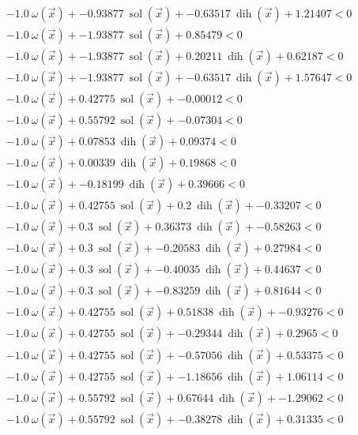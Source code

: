 \documentclass{article} %
\DeclareMathOperator{\sol}{sol}
\DeclareMathOperator{\dih}{dih}
\newcommand{\vx}{\vec{x}}
\begin{document}
\begin{align*}
&-1.0\ \omega(\vx) + -0.93877\ \sol(\vx) + -0.63517\ \dih(\vx) + 1.21407 < 0 \tag{D\_563250599} \\
&-1.0\ \omega(\vx) + -1.93877\ \sol(\vx) + 0.85479 < 0 \tag{D\_439521695} \\
&-1.0\ \omega(\vx) + -1.93877\ \sol(\vx) + 0.20211\ \dih(\vx) + 0.62187 < 0 \tag{D\_805633512} \\
&-1.0\ \omega(\vx) + -1.93877\ \sol(\vx) + -0.63517\ \dih(\vx) + 1.57647 < 0 \tag{D\_892141600} \\
&-1.0\ \omega(\vx) + 0.42775\ \sol(\vx) + -0.00012 < 0 \tag{D\_224306197} \\
&-1.0\ \omega(\vx) + 0.55792\ \sol(\vx) + -0.07304 < 0 \tag{D\_120210454} \\
&-1.0\ \omega(\vx) + 0.07853\ \dih(\vx) + 0.09374 < 0 \tag{D\_479875130} \\
&-1.0\ \omega(\vx) + 0.00339\ \dih(\vx) + 0.19868 < 0 \tag{D\_629548058} \\
&-1.0\ \omega(\vx) + -0.18199\ \dih(\vx) + 0.39666 < 0 \tag{D\_469668150} \\
&-1.0\ \omega(\vx) + 0.42755\ \sol(\vx) + 0.2\ \dih(\vx) + -0.33207 < 0 \tag{D\_218128189} \\
&-1.0\ \omega(\vx) + 0.3\ \sol(\vx) + 0.36373\ \dih(\vx) + -0.58263 < 0 \tag{D\_169113912} \\
&-1.0\ \omega(\vx) + 0.3\ \sol(\vx) + -0.20583\ \dih(\vx) + 0.27984 < 0 \tag{D\_143105921} \\
&-1.0\ \omega(\vx) + 0.3\ \sol(\vx) + -0.40035\ \dih(\vx) + 0.44637 < 0 \tag{D\_421739939} \\
&-1.0\ \omega(\vx) + 0.3\ \sol(\vx) + -0.83259\ \dih(\vx) + 0.81644 < 0 \tag{D\_595203705} \\
&-1.0\ \omega(\vx) + 0.42755\ \sol(\vx) + 0.51838\ \dih(\vx) + -0.93276 < 0 \tag{D\_943490566} \\
&-1.0\ \omega(\vx) + 0.42755\ \sol(\vx) + -0.29344\ \dih(\vx) + 0.2965 < 0 \tag{D\_797136399} \\
&-1.0\ \omega(\vx) + 0.42755\ \sol(\vx) + -0.57056\ \dih(\vx) + 0.53375 < 0 \tag{D\_603733089} \\
&-1.0\ \omega(\vx) + 0.42755\ \sol(\vx) + -1.18656\ \dih(\vx) + 1.06114 < 0 \tag{D\_459264712} \\
&-1.0\ \omega(\vx) + 0.55792\ \sol(\vx) + 0.67644\ \dih(\vx) + -1.29062 < 0 \tag{D\_557495949} \\
&-1.0\ \omega(\vx) + 0.55792\ \sol(\vx) + -0.38278\ \dih(\vx) + 0.31335 < 0 \tag{D\_171329882} \\

\end{align*}
\end{document}
